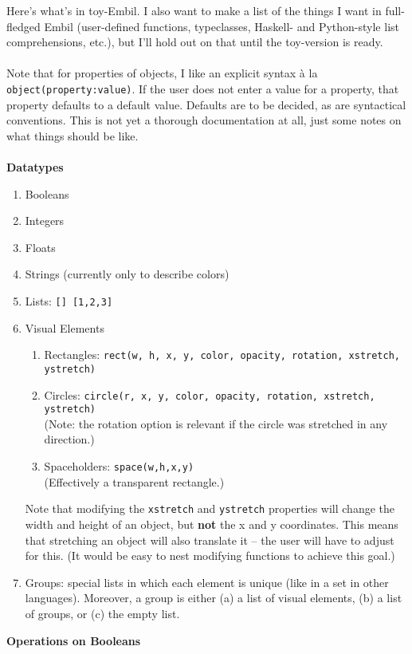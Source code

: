 \documentclass[12pt]{article}
\theoremstyle{remark}
\newcommand{\ttt}[1]{\texttt{#1}}
\begin{document}
\newpage 
\noindent
Here's what's in toy-Embil. I also want to make a list of the things I want in full-fledged Embil (user-defined functions, typeclasses, Haskell- and Python-style list comprehensions, etc.), but I'll hold out on that until the toy-version is ready.
\\\\
Note that for properties of objects, I like an explicit syntax \`a la \ttt{object(property:value)}. If the user does not enter a value for a property, that property defaults to a default value. Defaults are to be decided, as are syntactical conventions. This is not yet a thorough documentation at all, just some notes on what things should be like.
\\\\
\textbf{Datatypes}
\begin{enumerate}
\item Booleans
\item Integers
\item Floats
\item Strings (currently only to describe colors)
\item Lists: \ttt{[] [1,2,3]}
\item Visual Elements
\begin{enumerate}
\item Rectangles: \ttt{rect(w, h, x, y, color, opacity, rotation, xstretch, ystretch)}
\item Circles: \ttt{circle(r, x, y, color, opacity, rotation, xstretch, ystretch)}
\\ (Note: the rotation option is relevant if the circle was stretched in any direction.)
\item Spaceholders: \ttt{space(w,h,x,y)}
\\ (Effectively a transparent rectangle.)
\end{enumerate}
Note that modifying the \ttt{xstretch} and \ttt{ystretch} properties will change the width and height of an object, but \textbf{not} the x and y coordinates. This means that stretching an object will also translate it -- the user will have to adjust for this. (It would be easy to nest modifying functions to achieve this goal.)
\item Groups: special lists in which each element is unique (like in a set in other languages). Moreover, a group is either (a) a list of visual elements, (b) a list of groups, or (c) the empty list.
\end{enumerate}
\newpage
\noindent
\textbf{Operations on Booleans}
\\\\
\end{document}
